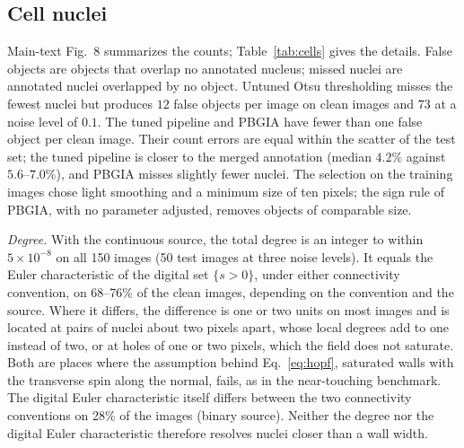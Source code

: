 \documentclass[11pt,a4paper]{article}
\begin{document}
\FloatBarrier
\subsection{Cell nuclei}\label{subsec:res:cells}
Main-text Fig.~8 summarizes the counts; Table~\ref{tab:cells} gives the details. False objects are objects that overlap no annotated nucleus; missed nuclei are annotated nuclei overlapped by no object. Untuned Otsu thresholding misses the fewest nuclei but produces $12$ false objects per image on clean images and $73$ at a noise level of $0.1$. The tuned pipeline and PBGIA have fewer than one false object per clean image. Their count errors are equal within the scatter of the test set; the tuned pipeline is closer to the merged annotation (median $4.2\%$ against $5.6$--$7.0\%$), and PBGIA misses slightly fewer nuclei. The selection on the training images chose light smoothing and a minimum size of ten pixels; the sign rule of PBGIA, with no parameter adjusted, removes objects of comparable size.

\emph{Degree.} With the continuous source, the total degree is an integer to within $5\times10^{-8}$ on all 150 images (50 test images at three noise levels). It equals the Euler characteristic of the digital set $\{s>0\}$, under either connectivity convention, on 68--76\% of the clean images, depending on the convention and the source. Where it differs, the difference is one or two units on most images and is located at pairs of nuclei about two pixels apart, whose local degrees add to one instead of two, or at holes of one or two pixels, which the field does not saturate. Both are places where the assumption behind Eq.~\eqref{eq:hopf}, saturated walls with the transverse spin along the normal, fails, as in the near-touching benchmark. The digital Euler characteristic itself differs between the two connectivity conventions on 28\% of the images (binary source). Neither the degree nor the digital Euler characteristic therefore resolves nuclei closer than a wall width.
\end{document}
